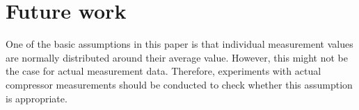 \section{Future work}
\label{sec:future_work}
One of the basic assumptions in this paper is that individual measurement values are normally distributed around their average value. However, this might not be the case for actual measurement data. Therefore, experiments with actual compressor measurements should be conducted to check whether this assumption is appropriate.\\